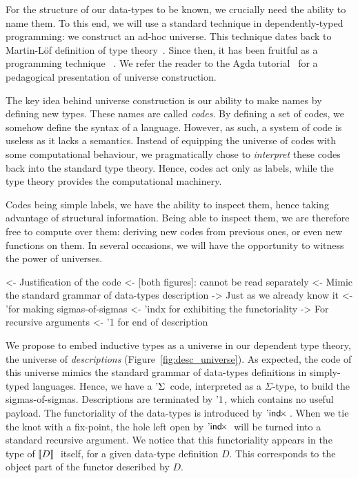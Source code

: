 For the structure of our data-types to be known, we crucially need the
ability to name them.  To this
end, we will use a standard technique in dependently-typed programming: we
construct an ad-hoc universe. This technique dates back to Martin-L\"of
definition of type theory~\cite{martin-lof:itt}. Since then, it has been
fruitful as a programming 
technique~\cite{benke:universe-generic-prog, oury:power-of-pi}
. 
We refer the reader to the Agda tutorial~\cite{norell:agda-tutorial} for a
pedagogical presentation of universe construction. 


The key idea behind universe construction is our ability to make names
by defining new types. These names are called \emph{codes}. By
defining a set of codes, we somehow define the syntax of a
language. However, as such, a system of code is useless as it lacks a
semantics. Instead of equipping the universe of codes with some
computational behaviour, we pragmatically chose to \emph{interpret}
these codes back into the standard type theory. Hence, codes act only
as labels, while the type theory provides the computational
machinery. 

Codes being simple labels, we have the ability to inspect them, hence
taking advantage of structural information. Being able to inspect
them, we are therefore free to compute over them: deriving new codes
from previous ones, or even new functions on them. In several
occasions, we will have the opportunity to witness the power of
universes.

\begin{wstructure}
<- Justification of the code 
    <- [both figures]: cannot be read separately
    <- Mimic the standard grammar of data-types description
        -> Just as we already know it
        <- '\Sigma for making sigmas-of-sigmas
        <- 'indx for exhibiting the functoriality
            -> For recursive arguments
        <- '1 for end of description
\end{wstructure}

We propose to embed inductive types as a universe in our dependent
type theory, the universe of \emph{descriptions}
(Figure~\ref{fig:desc_universe}). As expected, the code of this
universe mimics the standard grammar of data-types definitions in
simply-typed languages. Hence, we have a $\DSigma{\!}{\!}$ code,
interpreted as a $\Sigma$-type, to build the
sigmas-of-sigmas. Descriptions are terminated by $\DUnit$, which
contains no useful payload. The functoriality of the data-types is
introduced by $\DIndx$. When we tie the knot with a fix-point, the
hole left open by $\DIndx$ will be turned into a standard recursive
argument. We notice that this functoriality appears in the type of
$\descop{D}{}$ itself, for a given data-type definition $D$. This
corresponds to the object part of the functor described by $D$.

